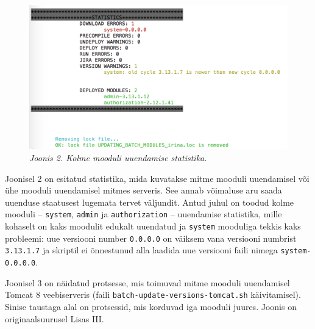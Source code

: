 \documentclass[12pt]{article}
\newcommand{\code}[1]{\texttt{#1}}
\begin{document}
   \begin{figure}[H]
     \begin{center}
       \includegraphics[width=\textwidth]{screenshots/statistics.png}
       \caption*{\textit{Joonis 2. Kolme mooduli uuendamise statistika.}}
     \end{center}
   \end{figure}
   
   Joonisel 2 on esitatud statistika, mida kuvatakse mitme mooduli uuendamisel või ühe mooduli uuendamisel mitmes serveris. See annab võimaluse aru saada uuenduse staatusest lugemata tervet väljundit. Antud juhul on toodud kolme mooduli \--- \code{system}, \code{admin} ja \code{authorization} \--- uuendamise statistika, mille kohaselt on  kaks moodulit edukalt uuendatud ja \code{system} mooduliga tekkis kaks probleemi: uue versiooni number \code{0.0.0.0} on väiksem vana versiooni numbrist \code{3.13.1.7} ja skriptil ei õnnestunud alla laadida uue versiooni faili nimega \code{system-0.0.0.0}. 
   
   Joonisel 3 on näidatud protsesse, mis toimuvad mitme mooduli uuendamisel Tomcat 8 veebiserveris (faili \code{batch-update-versions-tomcat.sh} käivitamisel). Sinise taustaga alal on protsessid, mis korduvad iga mooduli juures. Joonis on originaalsuurusel Lisas III.
   
\end{document}

